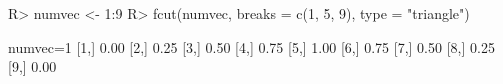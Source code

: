\begin{Schunk}
% --begin: "fcut.numeric1"
\begin{Sinput}
R> numvec <- 1:9
R> fcut(numvec, breaks = c(1, 5, 9), type = "triangle")
\end{Sinput}
\begin{Soutput}
      numvec=1
 [1,]     0.00
 [2,]     0.25
 [3,]     0.50
 [4,]     0.75
 [5,]     1.00
 [6,]     0.75
 [7,]     0.50
 [8,]     0.25
 [9,]     0.00
\end{Soutput}
%
% --end: "fcut.numeric1"
\end{Schunk}
